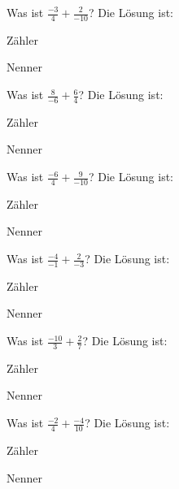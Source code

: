 \documentclass{ximera}
\begin{document}
\begin{shuffle}
\begin{question}
Was ist $\frac{-3}{4} + \frac{2}{-10}$?
Die Lösung ist:
\begin{solution}
Zähler 
\end{solution}
\begin{solution}
Nenner 
\end{solution}
\end{question}


\begin{question}
Was ist $\frac{8}{-6} + \frac{6}{4}$?
Die Lösung ist:
\begin{solution}
Zähler 
\end{solution}
\begin{solution}
Nenner 
\end{solution}
\end{question}


\begin{question}
Was ist $\frac{-6}{4} + \frac{9}{-10}$?
Die Lösung ist:
\begin{solution}
Zähler 
\end{solution}
\begin{solution}
Nenner 
\end{solution}
\end{question}


\begin{question}
Was ist $\frac{-4}{-1} + \frac{2}{-3}$?
Die Lösung ist:
\begin{solution}
Zähler 
\end{solution}
\begin{solution}
Nenner 
\end{solution}
\end{question}


\begin{question}
Was ist $\frac{-10}{3} + \frac{2}{7}$?
Die Lösung ist:
\begin{solution}
Zähler 
\end{solution}
\begin{solution}
Nenner 
\end{solution}
\end{question}


\begin{question}
Was ist $\frac{-2}{4} + \frac{-4}{10}$?
Die Lösung ist:
\begin{solution}
Zähler 
\end{solution}
\begin{solution}
Nenner 
\end{solution}
\end{question}



\end{shuffle}
\end{document}
